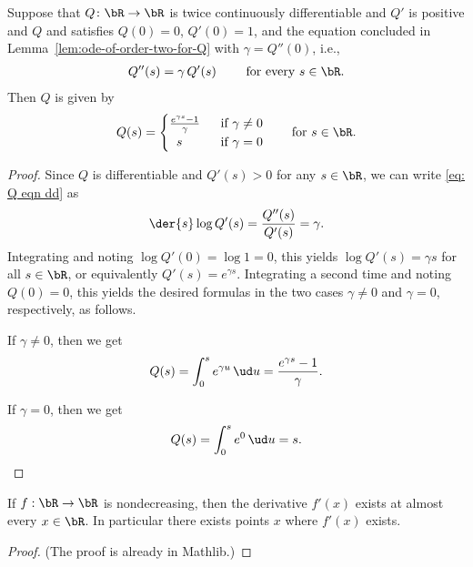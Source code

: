 \begin{lemma}
  \label{lem:solve-Q}
  \leanok
  Suppose that $Q \colon \bR \to \bR$ is twice continuously differentiable
  and $Q'$ is positive and $Q$
  and satisfies $Q(0)=0$, $Q'(0) = 1$, and the equation concluded in
  Lemma~\ref{lem:ode-of-order-two-for-Q} with $\gamma = Q''(0)$, i.e.,
  \begin{align}\label{eq: Q eqn dd}
  Q''(s) = \gamma \, Q'(s) \qquad \text{ for every } s \in \bR .
  \end{align}
  Then $Q$ is given by
  \begin{align*}
  Q(s) = \begin{cases}
    \frac{e^{\gamma s} - 1}{\gamma} & \; \text{ if $\gamma \ne 0$} \\
    \;\; s & \; \text{ if $\gamma = 0$}
    \end{cases}
    \qquad \text{for $s \in \bR$.}
  \end{align*}
  \end{lemma}
\begin{proof}
  Since $Q$ is differentiable and $Q'(s)>0$ for any $s \in \bR$,
  we can write \eqref{eq: Q eqn dd} as
  \begin{align*}
  \der{s} \log Q'(s)
    = \frac{Q''(s)}{Q'(s)}
    = \gamma .
  \end{align*}
  Integrating and noting $\log Q'(0) = \log 1 = 0$, this
  yields $\log Q'(s) = \gamma s$ for all $s \in \bR$, or equivalently
  $Q'(s) = e^{\gamma s}$. Integrating a second time
  and noting $Q(0) = 0$, this yields the desired formulas
  in the two cases $\gamma \ne 0$ and $\gamma = 0$, respectively, as follows.

  If $\gamma \ne 0$, then we get
  \begin{align*}
  Q(s) = \int_0^s e^{\gamma u} \, \ud u = \frac{e^{\gamma s} - 1}{\gamma} .
  \end{align*}

  If $\gamma = 0$, then we get
  \begin{align*}
  Q(s) = \int_0^s e^0 \, \ud u = s .
  \end{align*}
\end{proof}

\begin{theorem}
  \label{thm:monotone-ae-differentiable}
  \leanok
  \mathlibok
  If $f : \bR \to \bR$ is nondecreasing, then the derivative
  $f'(x)$ exists at almost every $x \in \bR$.
  In particular there exists points $x$ where $f'(x)$ exists.
\end{theorem}
\begin{proof}
  \leanok
  \mathlibok
  (The proof is already in Mathlib.)
\end{proof}

